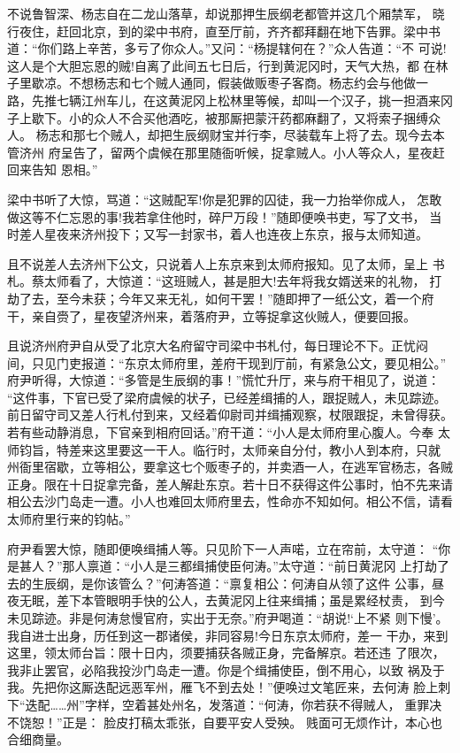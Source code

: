 不说鲁智深、杨志自在二龙山落草，却说那押生辰纲老都管并这几个厢禁军，
晓行夜住，赶回北京，到的梁中书府，直至厅前，齐齐都拜翻在地下告罪。梁中书
道：“你们路上辛苦，多亏了你众人。”又问：“杨提辖何在？”众人告道：“不
可说!这人是个大胆忘恩的贼!自离了此间五七日后，行到黄泥冈时，天气大热，都
在林子里歇凉。不想杨志和七个贼人通同，假装做贩枣子客商。杨志约会与他做一
路，先推七辆江州车儿，在这黄泥冈上松林里等候，却叫一个汉子，挑一担酒来冈
子上歇下。小的众人不合买他酒吃，被那厮把蒙汗药都麻翻了，又将索子捆缚众人。
杨志和那七个贼人，却把生辰纲财宝并行李，尽装载车上将了去。现今去本管济州
府呈告了，留两个虞候在那里随衙听候，捉拿贼人。小人等众人，星夜赶回来告知
恩相。”

梁中书听了大惊，骂道：“这贼配军!你是犯罪的囚徒，我一力抬举你成人，
怎敢做这等不仁忘恩的事!我若拿住他时，碎尸万段！”随即便唤书吏，写了文书，
当时差人星夜来济州投下；又写一封家书，着人也连夜上东京，报与太师知道。

且不说差人去济州下公文，只说着人上东京来到太师府报知。见了太师，呈上
书札。蔡太师看了，大惊道：“这班贼人，甚是胆大!去年将我女婿送来的礼物，
打劫了去，至今未获；今年又来无礼，如何干罢！”随即押了一纸公文，着一个府
干，亲自赍了，星夜望济州来，着落府尹，立等捉拿这伙贼人，便要回报。

且说济州府尹自从受了北京大名府留守司梁中书札付，每日理论不下。正忧闷
间，只见门吏报道：“东京太师府里，差府干现到厅前，有紧急公文，要见相公。”
府尹听得，大惊道：“多管是生辰纲的事！”慌忙升厅，来与府干相见了，说道：
“这件事，下官已受了梁府虞候的状子，已经差缉捕的人，跟捉贼人，未见踪迹。
前日留守司又差人行札付到来，又经着仰尉司并缉捕观察，杖限跟捉，未曾得获。
若有些动静消息，下官亲到相府回话。”府干道：“小人是太师府里心腹人。今奉
太师钧旨，特差来这里要这一干人。临行时，太师亲自分付，教小人到本府，只就
州衙里宿歇，立等相公，要拿这七个贩枣子的，并卖酒一人，在逃军官杨志，各贼
正身。限在十日捉拿完备，差人解赴东京。若十日不获得这件公事时，怕不先来请
相公去沙门岛走一遭。小人也难回太师府里去，性命亦不知如何。相公不信，请看
太师府里行来的钧帖。”

府尹看罢大惊，随即便唤缉捕人等。只见阶下一人声喏，立在帘前，太守道：
“你是甚人？”那人禀道：“小人是三都缉捕使臣何涛。”太守道：“前日黄泥冈
上打劫了去的生辰纲，是你该管么？”何涛答道：“禀复相公：何涛自从领了这件
公事，昼夜无眠，差下本管眼明手快的公人，去黄泥冈上往来缉捕；虽是累经杖责，
到今未见踪迹。非是何涛怠慢官府，实出于无奈。”府尹喝道：“胡说!‘上不紧
则下慢’。我自进士出身，历任到这一郡诸侯，非同容易!今日东京太师府，差一
干办，来到这里，领太师台旨：限十日内，须要捕获各贼正身，完备解京。若还违
了限次，我非止罢官，必陷我投沙门岛走一遭。你是个缉捕使臣，倒不用心，以致
祸及于我。先把你这厮迭配远恶军州，雁飞不到去处！”便唤过文笔匠来，去何涛
脸上刺下“迭配……州”字样，空着甚处州名，发落道：“何涛，你若获不得贼人，
重罪决不饶恕！”正是：
脸皮打稿太乖张，自要平安人受殃。
贱面可无烦作计，本心也合细商量。

